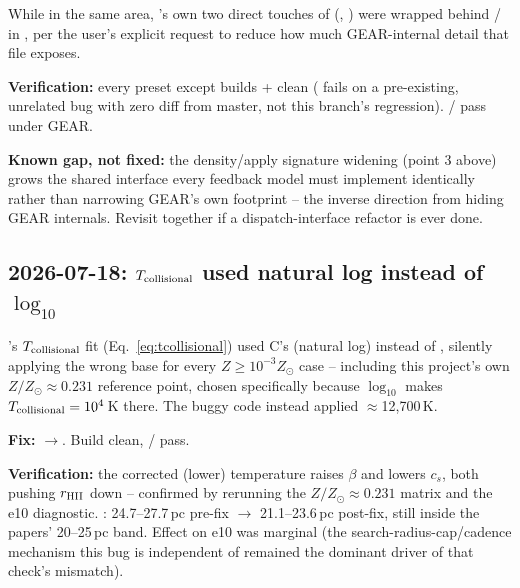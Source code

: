 While in the same area, 's own two
direct touches of 
(, ) were wrapped
behind /
 in
, per the user's explicit request to
reduce how much GEAR-internal detail that file exposes.

\textbf{Verification:} every  preset except
 builds + clean (
fails on a pre-existing, unrelated bug with zero diff from master, not
this branch's regression). /
 pass under GEAR.

\textbf{Known gap, not fixed:} the density/apply signature widening
(point 3 above) grows the shared interface every feedback model must
implement identically rather than narrowing GEAR's own footprint --
the inverse direction from hiding GEAR internals. Revisit together if
a dispatch-interface refactor is ever done.

\subsection{2026-07-18: $T_{\rm collisional}$ used natural log instead
of $\log_{10}$}
\label{sec:t12-log10-bug}

's $T_{\rm collisional}$ fit (Eq.~\ref{eq:tcollisional})
used C's  (natural log) instead of , silently
applying the wrong base for every $Z\ge10^{-3}Z_\odot$ case -- including
this project's own $Z/Z_\odot\approx0.231$ reference point, chosen
specifically because $\log_{10}$ makes $T_{\rm collisional}=10^4\,$K
there. The buggy code instead applied $\approx$12,700\,K.

\textbf{Fix:} $\to$. Build clean,
/
pass.

\textbf{Verification:} the corrected (lower) temperature raises $\beta$
and lowers $c_s$, both pushing $r_{\rm HII}$ down -- confirmed by
rerunning the $Z/Z_\odot\approx0.231$ matrix and the e10 diagnostic.
: 24.7--27.7\,pc pre-fix
$\to$ 21.1--23.6\,pc post-fix, still inside the papers' 20--25\,pc
band. Effect on e10 was marginal (the search-radius-cap/cadence
mechanism this bug is independent of remained the dominant driver of
that check's mismatch).

